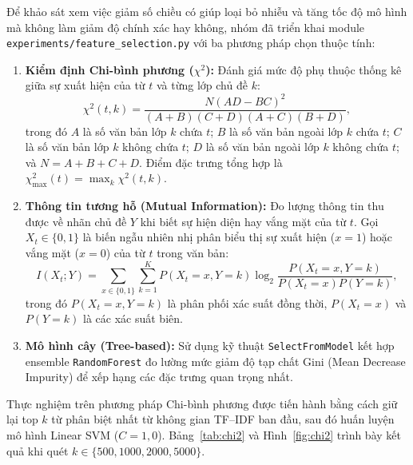 \documentclass[12pt]{hcmut-report}
\newcommand{\firstparagraph}{\noindent\hspace*{2em}}
\begin{document}
\firstparagraph Để khảo sát xem việc giảm số chiều có giúp loại bỏ nhiễu và tăng tốc độ mô hình mà không làm giảm độ chính xác hay không, nhóm đã triển khai module \texttt{experiments/\allowbreak feature\_selection.py} với ba phương pháp chọn thuộc tính:
\begin{enumerate}[leftmargin=2em,itemsep=5pt]
  \item \textbf{Kiểm định Chi-bình phương ($\chi^2$):} Đánh giá mức độ phụ thuộc thống kê giữa sự xuất hiện của từ $t$ và từng lớp chủ đề $k$:
  \begin{equation}
    \chi^2(t, k) = \frac{N (AD - BC)^2}{(A+B)(C+D)(A+C)(B+D)},
    \label{eq:chi2}
  \end{equation}
  trong đó $A$ là số văn bản lớp $k$ chứa $t$; $B$ là số văn bản ngoài lớp $k$ chứa $t$; $C$ là số văn bản lớp $k$ không chứa $t$; $D$ là số văn bản ngoài lớp $k$ không chứa $t$; và $N=A+B+C+D$. Điểm đặc trưng tổng hợp là $\chi^2_{\max}(t) = \max_k \chi^2(t, k)$.
  \item \textbf{Thông tin tương hỗ (Mutual Information):} Đo lượng thông tin thu được về nhãn chủ đề $Y$ khi biết sự hiện diện hay vắng mặt của từ $t$. Gọi $X_t \in \{0, 1\}$ là biến ngẫu nhiên nhị phân biểu thị sự xuất hiện ($x=1$) hoặc vắng mặt ($x=0$) của từ $t$ trong văn bản:
  \begin{equation}
    I(X_t; Y) = \sum_{x \in \{0, 1\}} \sum_{k=1}^K P(X_t=x, Y=k) \log_2 \frac{P(X_t=x, Y=k)}{P(X_t=x) P(Y=k)},
    \label{eq:mutual-info}
  \end{equation}
  trong đó $P(X_t=x, Y=k)$ là phân phối xác suất đồng thời, $P(X_t=x)$ và $P(Y=k)$ là các xác suất biên.
  \item \textbf{Mô hình cây (Tree-based):} Sử dụng kỹ thuật \texttt{SelectFromModel} kết hợp ensemble \texttt{RandomForest} đo lường mức giảm độ tạp chất Gini (Mean Decrease Impurity) để xếp hạng các đặc trưng quan trọng nhất.
\end{enumerate}

Thực nghiệm trên phương pháp Chi-bình phương được tiến hành bằng cách giữ lại top $k$ từ phân biệt nhất từ không gian TF--IDF ban đầu, sau đó huấn luyện mô hình Linear SVM ($C=1{,}0$). Bảng~\ref{tab:chi2} và Hình~\ref{fig:chi2} trình bày kết quả khi quét $k \in \{500, 1000, 2000, 5000\}$.
\end{document}
